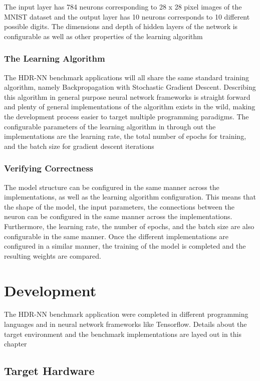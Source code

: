 The input layer has 784 neurons corresponding to 28 x 28 pixel images of the MNIST dataset and the output layer has 10 neurons corresponds to 10 different possible digits. The dimensions and depth of hidden layers of the network is configurable as well as other properties of the learning algorithm

\subsection[HDR-NN Training]{The Learning Algorithm}

The HDR-NN benchmark applications will all share the same standard training algorithm, namely Backpropagation with Stochastic Gradient Descent. Describing this algorithm in general purpose neural network frameworks is straight forward and plenty of general implementations of the algorithm exists in the wild, making the development process easier to target multiple programming paradigms. The configurable parameters of the learning algorithm in through out the implementations are the learning rate, the total number of epochs for training, and the batch size for gradient descent iterations

\subsection[Verifying Correctness]{Verifying Correctness}

The model structure can be configured in the same manner across the implementations, as well as the learning algorithm configuration. This means that the shape of the model, the input parameters, the connections between the neuron can be configured in the same manner across the implementations. Furthermore, the learning rate, the number of epochs, and the batch size are also configurable in the same manner. Once the different implementations are configured in a similar manner, the training of the model is completed and the resulting weights are compared.

\chapter{Development}

The HDR-NN benchmark application were completed in different programming languages and in neural network frameworks like Tensorflow. Details about the target environment and the benchmark implementations are layed out in this chapter

\section[iMX6 Custom Board Target]{Target Hardware}

